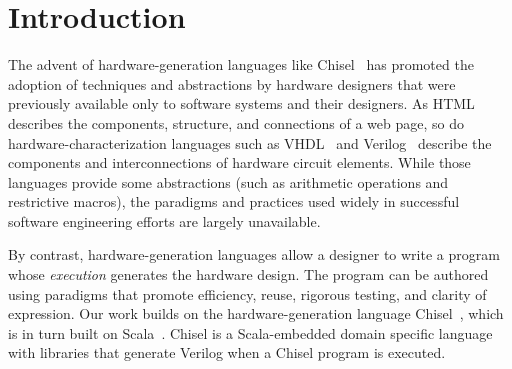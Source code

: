 \documentclass[sigplan,anonymous,review]{acmart}
\begin{document}

\maketitle

\section{Introduction}

The advent of hardware-generation languages like Chisel~\cite{chisel:article} has promoted the adoption of techniques and abstractions by hardware designers that were previously available only to software systems and their designers. As HTML describes the components, structure, and connections of a web page, so do hardware-characterization languages such as VHDL~\cite{vhdl} and Verilog~\cite{verilog} describe the components and interconnections of hardware circuit elements. While those languages provide some abstractions (such as arithmetic operations and restrictive macros), the paradigms and practices used widely in successful software engineering efforts are largely unavailable.

By contrast, hardware-generation languages allow a designer to write a program whose \emph{execution} generates the hardware design. The program can be authored using para\-digms that promote efficiency, reuse, rigorous testing, and clarity of expression. Our work builds on the hardware-generation language Chisel~\cite{chisel:book}, which is in turn built on Scala~\cite{scala-overview-tech-report}. Chisel is a Scala-embedded domain specific language with libraries that generate Verilog when a Chisel program is executed.

\end{document}
